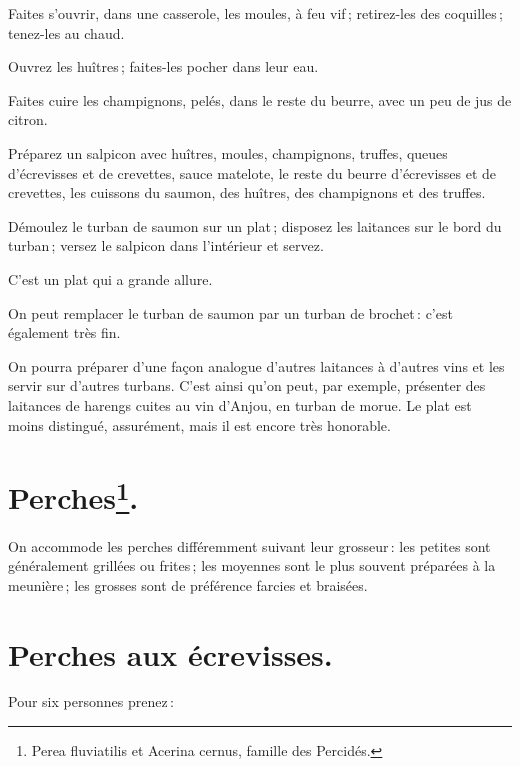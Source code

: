 Faites s'ouvrir, dans une casserole, les moules, à feu vif ; retirez-les des
coquilles ; tenez-les au chaud.

Ouvrez les huîtres ; faites-les pocher dans leur eau.

Faites cuire les champignons, pelés, dans le reste du beurre, avec un peu de
jus de citron.

Préparez un salpicon avec huîtres, moules, champignons, truffes, queues
d'écrevisses et de crevettes, sauce matelote, le reste du beurre d'écrevisses
et de crevettes, les cuissons du saumon, des huîtres, des champignons et des
truffes.

Démoulez le turban de saumon sur un plat ; disposez les laitances sur le bord
du turban ; versez le salpicon dans l'intérieur et servez.

C'est un plat qui a grande allure.

\sk

On peut remplacer le turban de saumon par un turban de brochet : c'est
également très fin.

\sk

On pourra préparer d'une façon analogue d’autres laitances à d'autres vins et
les servir sur d'autres turbans. C'est ainsi qu'on peut, par exemple, présenter
des laitances de harengs cuites au vin d'Anjou, en turban de morue. Le plat est
moins distingué, assurément, mais il est encore très honorable.

\section*{\centering Perches\footnote{Perea fluviatilis et Acerina cernus, famille des Percidés.}.}

On accommode les perches différemment suivant leur grosseur : les petites sont
généralement grillées ou frites ; les moyennes sont le plus souvent préparées
à la meunière ; les grosses sont de préférence farcies et braisées.

\section*{\centering Perches aux écrevisses.}

Pour six personnes prenez :

\medskip

